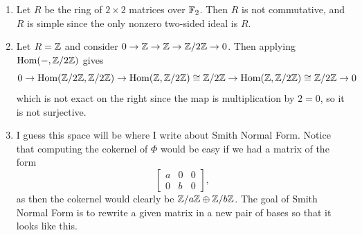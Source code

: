 \begin{solution}
\begin{enumerate}
    \item Let $R$ be the ring of $2 \times 2$ matrices over $\mathbb{F}_2$. Then $R$ is not commutative, and $R$ is simple since the only nonzero two-sided ideal is $R$.
    \item Let $R = \mathbb{Z}$ and consider $0 \to \mathbb{Z} \to \mathbb{Z} \to \mathbb{Z}/2\mathbb{Z} \to 0$. Then applying $\operatorname{Hom}(-,\mathbb{Z}/2\mathbb{Z})$ gives
    \[ 0 \to \operatorname{Hom}(\mathbb{Z}/2\mathbb{Z},\mathbb{Z}/2\mathbb{Z}) \to \operatorname{Hom}(\mathbb{Z}, \mathbb{Z}/2\mathbb{Z})\cong \mathbb{Z}/2\mathbb{Z} \to \operatorname{Hom}(\mathbb{Z},\mathbb{Z}/2\mathbb{Z})\cong \mathbb{Z}/2\mathbb{Z} \to 0\]
    which is not exact on the right since the map is multiplication by $2=0$, so it is not surjective.
    \item I guess this space will be where I write about Smith Normal Form. Notice that computing the cokernel of $\Phi$ would be easy if we had a matrix of the form
    \[\begin{bmatrix} a & 0 & 0\\ 0 & b & 0 \end{bmatrix},\]
    as then the cokernel would clearly be $\mathbb{Z}/a\mathbb{Z} \oplus \mathbb{Z}/b\mathbb{Z}$. The goal of Smith Normal Form is to rewrite a given matrix in a new pair of bases so that it looks like this.


\end{enumerate}
\end{solution}
